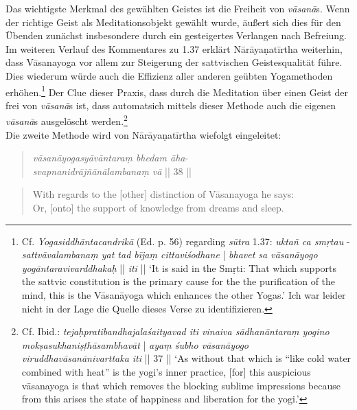 Das wichtigste Merkmal des gewählten Geistes ist die Freiheit von \textit{vāsanā}s. Wenn der richtige Geist als Meditationsobjekt gewählt wurde, äußert sich dies für den Übenden zunächst insbesondere durch ein gesteigertes Verlangen nach Befreiung. Im weiteren Verlauf des Kommentares zu 1.37 erklärt Nārāyaṇatīrtha weiterhin, dass Vāsanayoga vor allem zur Steigerung der sattvischen Geistesqualität führe. Dies wiederum würde auch die Effizienz aller anderen geübten Yogamethoden erhöhen.\footnote{Cf. \textit{Yogasiddhāntacandrikā} (Ed. p. 56) regarding \textit{sūtra} 1.37: \textit{uktañ ca smṛtau} - \textit{sattvāvalambanaṃ yat tad bījaṃ cittaviśodhane} | \textit{bhavet sa vāsanāyogo yogāntaravivarddhakaḥ} || \textit{iti} || `It is said in the Smṛti: That which supports the sattvic constitution is the primary cause for the the purification of the mind, this is the Vāsanāyoga which enhances the other Yogas.' Ich war leider nicht in der Lage die Quelle dieses Verse zu identifizieren.} Der Clue dieser Praxis, dass durch die Meditation über einen Geist der frei von \textit{vāsanā}s ist, dass automatsich mittels dieser Methode auch die eigenen \textit{vāsanā}s ausgelöscht werden.\footnote{Cf. Ibid.: \textit{tejaḥpratibandhajalaśaityavad iti vinaiva sādhanāntaraṃ yogino mokṣasukhaniṣṭhāsambhavāt} | \textit{ayaṃ śubho vāsanāyogo viruddhavāsanānivarttaka iti} || 37 || `As without that which is ``like cold water combined with heat'' is the yogi's inner practice, [for] this auspicious vāsanayoga is that which removes the blocking sublime impressions because from this arises the state of happiness and liberation for the yogi.'}\\

Die zweite Methode wird von Nārāyaṇatīrtha wiefolgt eingeleitet:
\begin{quote}
\textit{vāsanāyogasyāvāntaraṃ bhedam āha}-\\
\textit{svapnanidrājñānālambanaṃ vā} || 38 ||
\end{quote}
\begin{quote}
With regards to the [other] distinction of Vāsanayoga he says:\\ 
Or, [onto] the support of knowledge from dreams and sleep. 
\end{quote}


